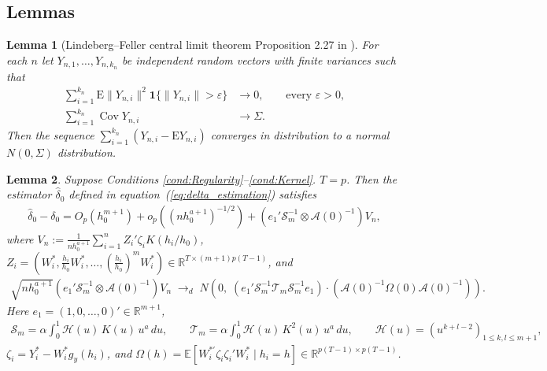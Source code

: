 \documentclass{article}
\newtheorem{lemma}{Lemma}
\newcommand{\E}{\mathbb{E}}
\newcommand{\R}{\mathbb{R}}
\begin{document}
\begin{appendices}
\section{Lemmas}
\begin{lemma}[Lindeberg--Feller central limit theorem Proposition 2.27 in \cite{van2000asymptotic}]\label{lemma:LF_CLT}
For each $n$ let $Y_{n,1}, \dots, Y_{n,k_n}$ be independent random vectors with finite variances such that
\begin{align}
\sum_{i=1}^{k_n} \mathrm{E} \|Y_{n,i}\|^2 \mathbf{1}\{\|Y_{n,i}\| > \varepsilon\} &\to 0, \qquad \text{every } \varepsilon > 0, \\
\sum_{i=1}^{k_n} \operatorname{Cov} Y_{n,i} &\to \Sigma.
\end{align}
Then the sequence $\sum_{i=1}^{k_n} (Y_{n,i} - \mathrm{E} Y_{n,i})$ converges in distribution to a normal $N(0,\Sigma)$ distribution.
\end{lemma}

\begin{lemma}\label{lemma:delta_convergence}
Suppose Conditions \ref{cond:Regularity}--\ref{cond:Kernel}. $T=p$. Then the estimator $\hat\delta_0$ defined in
equation~(\ref{eq:delta_estimation}) satisfies
\begin{align*}
    \hat{\delta}_0-\delta_0
    = O_p\!\left(h_0^{m+1}\right)
    + o_p\!\left((nh_0^{a+1})^{-1/2}\right)
    + \left(e_1'\mathcal{S}_m^{-1}\otimes \mathcal{A}(0)^{-1}\right) V_n ,
\end{align*}
where $V_n:=\frac{1}{nh_0^{a+1}}\sum_{i=1}^n Z_i'\zeta_i K(h_i/h_0)$, $Z_i = (W_i^*,\frac{h_i}{h_0}W_i^*,\dots,(\frac{h_i}{h_0})^m W_i^*)\in\R^{T\times(m+1)p(T-1)}$, and
\begin{align*}
    \sqrt{nh_0^{a+1}}\left(e_1'\mathcal{S}_m^{-1}\otimes \mathcal{A}(0)^{-1}\right) V_n
    \;\to_d\;
    N\!\left(0,\;\left(e_1'\mathcal{S}_m^{-1}\mathcal{T}_m\mathcal{S}_m^{-1}e_1\right)
    \cdot\left(\mathcal{A}(0)^{-1}\Omega(0)\mathcal{A}(0)^{-1}\right)\right).
\end{align*}
Here $e_1=(1,0,\dots,0)'\in\R^{m+1}$,
\begin{align*}
    \mathcal{S}_m = \alpha\int_{0}^{1}\mathcal{H}(u)\,K(u)\,u^{a}\,du,
    \qquad
    \mathcal{T}_m = \alpha\int_{0}^{1}\mathcal{H}(u)\,K^2(u)\,u^{a}\,du,
    \qquad
    \mathcal{H}(u) = \left(u^{k+l-2}\right)_{1\le k,l\le m+1},
\end{align*}
$\zeta_i = Y_i^{*}-W_i^{*}g_y(h_i)$, and
$\Omega(h)=\E\!\left[W_i^{*\prime}\zeta_i\zeta_i'W_i^{*}\mid h_i=h\right]
\in\R^{p(T-1)\times p(T-1)}$.
\end{lemma}




\end{appendices}
\end{document}
